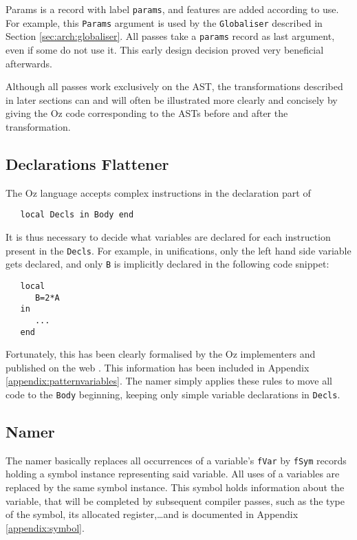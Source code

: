 \documentclass[a4paper]{memoir}
\begin{document}
Params is a record with label \lstinline!params!, and features are added
according to use. For example, this \lstinline!Params! argument is used by
the \lstinline!Globaliser! described in Section \ref{sec:arch:globaliser}. All
passes take a \lstinline!params! record as last argument, even if some do not use it. 
This early design decision proved very beneficial afterwards.


Although all passes work exclusively on the AST, the transformations described in later sections can and will often be illustrated more clearly and concisely by giving the Oz code corresponding to the ASTs before and after the transformation. 

\subsection{Declarations Flattener}\label{sec:arch:declsflattener}
The Oz language accepts complex instructions in the declaration part of
\begin{lstlisting}
   local Decls in Body end
\end{lstlisting}
 It is thus necessary to decide what variables are declared for each instruction present in the \lstinline!Decls!. 
For example, in unifications, only the left hand side variable gets declared,
and only \lstinline!B! is implicitly declared in the following code snippet:
\begin{lstlisting}
   local
      B=2*A
   in
      ...
   end
\end{lstlisting}
Fortunately, this has been clearly formalised by the Oz implementers and published on the web \cite{BaseLang}. This information has been included in Appendix \ref{appendix:patternvariables}. The namer simply applies these rules to move all code to the \lstinline!Body! beginning, keeping only simple variable declarations in \lstinline!Decls!.

\subsection{Namer}\label{sec:arch:namer}
The namer  basically replaces all occurrences of a variable's \lstinline!fVar! by \lstinline!fSym! records holding a symbol instance representing said variable. All uses of a variables are replaced by the same symbol instance. This symbol holds information about the variable, that will be completed by subsequent compiler passes, such as the type of the symbol, its allocated register,\ldots and is documented in Appendix \ref{appendix:symbol}.
\end{document}
